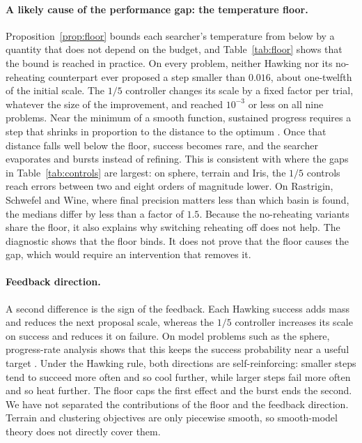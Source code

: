 \documentclass[10pt,a4paper]{article}
\begin{document}
\paragraph{A likely cause of the performance gap: the temperature floor.}
Proposition~\ref{prop:floor} bounds each searcher's temperature from below by a
quantity that does not depend on the budget, and Table~\ref{tab:floor} shows
that the bound is reached in practice. On every problem, neither Hawking nor
its no-reheating counterpart ever proposed a step smaller than $0.016$, about
one-twelfth of the initial scale. The $1/5$ controller changes its scale by a
fixed factor per trial, whatever the size of the improvement, and reached
$10^{-3}$ or less on all nine problems. Near the minimum of a smooth function,
sustained progress requires a step that shrinks in proportion to the distance
to the optimum \citep{rechenberg1973,beyer2002}. Once that distance falls well
below the floor, success becomes rare, and the searcher evaporates and bursts
instead of refining. This is consistent with where the gaps in
Table~\ref{tab:controls} are largest: on sphere, terrain and Iris, the $1/5$
controls reach errors between two and eight orders of magnitude lower. On
Rastrigin, Schwefel and Wine, where final precision matters less than which
basin is found, the medians differ by less than a factor of $1.5$. Because
the no-reheating variants share the floor, it also explains why switching
reheating off does not help. The diagnostic shows that the floor binds. It
does not prove that the floor causes the gap, which would require an
intervention that removes it.

\paragraph{Feedback direction.} A second difference is the sign of the feedback.
Each Hawking success adds mass and reduces the next proposal scale, whereas the
$1/5$ controller increases its scale on success and reduces it on failure. On
model problems such as the sphere, progress-rate analysis shows that this keeps
the success probability near a useful target \citep{rechenberg1973,beyer2002}.
Under the Hawking rule, both directions are self-reinforcing: smaller steps tend
to succeed more often and so cool further, while larger steps fail more often
and so heat further. The floor caps the first effect and the burst ends the
second. We have not separated the contributions of the floor and the feedback
direction. Terrain and clustering objectives are only piecewise smooth, so
smooth-model theory does not directly cover them.
\end{document}
